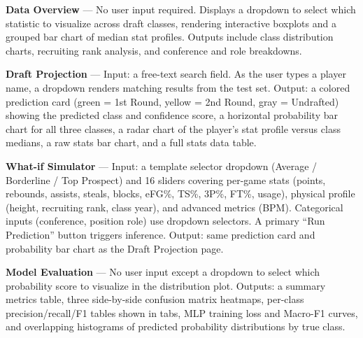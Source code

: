 \textbf{Data Overview} --- No user input required. Displays a dropdown to select which statistic to visualize across draft classes, rendering interactive boxplots and a grouped bar chart of median stat profiles. Outputs include class distribution charts, recruiting rank analysis, and conference and role breakdowns.

\textbf{Draft Projection} --- Input: a free-text search field. As the user types a player name, a dropdown renders matching results from the test set. Output: a colored prediction card (green = 1st Round, yellow = 2nd Round, gray = Undrafted) showing the predicted class and confidence score, a horizontal probability bar chart for all three classes, a radar chart of the player's stat profile versus class medians, a raw stats bar chart, and a full stats data table.

\textbf{What-if Simulator} --- Input: a template selector dropdown (Average / Borderline / Top Prospect) and 16 sliders covering per-game stats (points, rebounds, assists, steals, blocks, eFG\%, TS\%, 3P\%, FT\%, usage), physical profile (height, recruiting rank, class year), and advanced metrics (BPM). Categorical inputs (conference, position role) use dropdown selectors. A primary ``Run Prediction'' button triggers inference. Output: same prediction card and probability bar chart as the Draft Projection page.

\textbf{Model Evaluation} --- No user input except a dropdown to select which probability score to visualize in the distribution plot. Outputs: a summary metrics table, three side-by-side confusion matrix heatmaps, per-class precision/recall/F1 tables shown in tabs, MLP training loss and Macro-F1 curves, and overlapping histograms of predicted probability distributions by true class.

